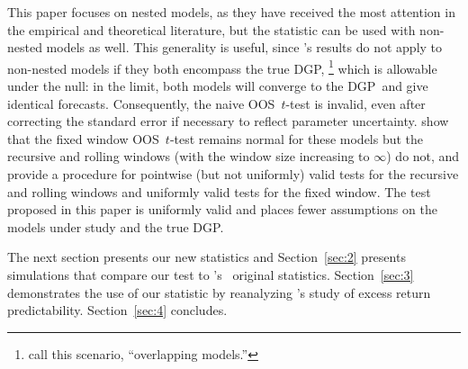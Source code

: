 \documentclass[12pt,fleqn]{article}
\newcommand\citepos[2][]{\citeauthor{#2}'s \citeyearpar[#1]{#2}}
\newcommand\poscw{\citeauthor{ClW:06}'s \citeyearpar{ClW:06,ClW:07}}
\theoremstyle{definition}
\newcommand{\dgp}{DGP}
\newcommand{\oos}{OOS}
\begin{document}
This paper focuses on nested models, as they have received the most
attention in the empirical and theoretical literature, but the
statistic can be used with non-nested models as well.  This generality
is useful, since \citepos{Wes:96} results do not apply to non-nested
models if they both encompass the true \dgp,%
\footnote{\citet{ClM:11b}
  call this scenario, ``overlapping models.''} %
which is allowable
under the null: in the limit, both models will converge to the \dgp\
and give identical forecasts.  Consequently, the naive \oos\ $t$-test
is invalid, even after correcting the standard error if necessary to
reflect parameter uncertainty.  \citet{ClM:11b} show that the fixed
window \oos\ $t$-test remains normal for these models but the
recursive and rolling windows (with the window size increasing to
$\infty$) do not, and provide a procedure for pointwise (but not
uniformly) valid tests for the recursive and rolling windows and
uniformly valid tests for the fixed window.  The test proposed in this
paper is uniformly valid and places fewer assumptions on the models
under study and the true \dgp.

The next section presents our new statistics and Section~\ref{sec:2} presents
simulations that compare our test to \poscw\ original
statistics.  Section~\ref{sec:3} demonstrates the use of our statistic
by reanalyzing \citepos{GoW:08} study of excess return
predictability. Section~\ref{sec:4} concludes.
\end{document}
